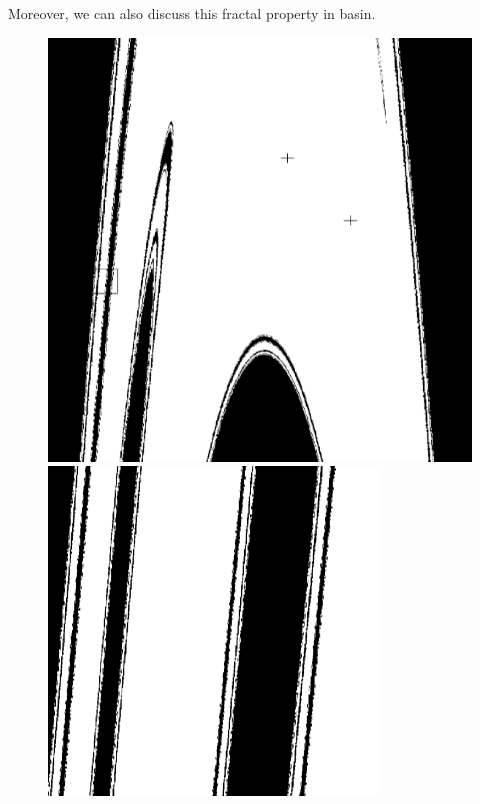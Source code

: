 \documentclass[12pt]{article}
\theoremstyle{plain}
\begin{document}
Moreover, we can also discuss this fractal property in basin.\\[5ex]
\begin{figure}[H]
\begin{minipage}[c][0.33\width]{
   0.33\textwidth}
   \centering
   \includegraphics[width=.7\textwidth]{figure/section4/Henon-basin-00.png}
\end{minipage}
\begin{minipage}[c][0.33\width]{
   0.33\textwidth}
   \centering
   \includegraphics[width=.7\textwidth]{figure/section4/Henon-basin-01.png}
\end{minipage}
\begin{minipage}[c][0.33\width]{
   0.33\textwidth}
   \centering

\end{minipage}
\end{figure}
\end{document}
